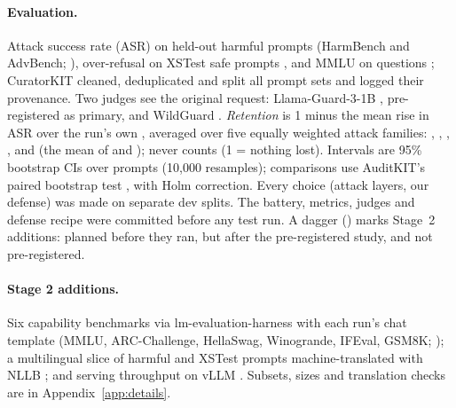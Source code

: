 \paragraph{Evaluation.} Attack success rate (ASR) on  held-out harmful prompts (HarmBench and
AdvBench; \citealp{mazeika2024harmbench,zou2023universal}), over-refusal on  XSTest safe prompts
\citep{rottger2024xstest}, and MMLU on  questions \citep{hendrycks2021mmlu}; CuratorKIT \citep{bhattacharjee2026curatorkitdatacuration} cleaned, deduplicated and split all prompt sets and logged their provenance. Two judges see the
original request: Llama-Guard-3-1B \citep{inan2023llamaguard,meta2024llamaguard3}, pre-registered as primary, and WildGuard
\citep{han2024wildguard}. \emph{Retention} is 1 minus the mean rise in ASR over the run's own , averaged over five
equally weighted attack families: , , , , and  (the mean of 
and );  never counts (1 = nothing lost). Intervals are 95\% bootstrap CIs over prompts (10{,}000 resamples); comparisons use AuditKIT's paired bootstrap test \citep{arora2026auditkitunifiedevaluationspine,auditkit2026}, with Holm
correction. Every choice (attack layers, our defense) was made on separate dev splits. The battery, metrics, judges
and defense recipe were committed before any test run. A dagger (\stagetwo) marks Stage~2 additions: planned
before they ran, but after the pre-registered study, and not pre-registered.

\paragraph{Stage 2 additions\stagetwo.} Six capability benchmarks via lm-evaluation-harness
\citep{gao2024evalharness,biderman2024lessons} with each run's chat template (MMLU, ARC-Challenge, HellaSwag, Winogrande, IFEval, GSM8K;
\citealp{clark2018arc,zellers2019hellaswag,sakaguchi2020winogrande,zhou2023ifeval,cobbe2021gsm8k}); a multilingual
slice of  harmful and  XSTest prompts machine-translated with NLLB
\citep{nllb2022}; and serving throughput on vLLM \citep{kwon2023vllm}. Subsets, sizes and translation checks are in
Appendix~\ref{app:details}.
